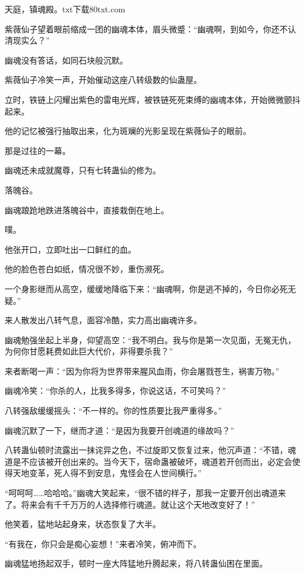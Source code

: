 
\begin{this_body}

天庭，镇魂殿。txt下载80txt.com

紫薇仙子望着眼前缩成一团的幽魂本体，眉头微蹙：“幽魂啊，到如今，你还不认清现实么？”

幽魂没有答话，如同石块般沉默。

紫薇仙子冷笑一声，开始催动这座八转级数的仙蛊屋。

立时，铁链上闪耀出紫色的雷电光辉，被铁链死死束缚的幽魂本体，开始微微颤抖起来。

他的记忆被强行抽取出来，化为斑斓的光影呈现在紫薇仙子的眼前。

那是过往的一幕。

幽魂还未成就魔尊，只有七转蛊仙的修为。

落魄谷。

幽魂踉跄地跌进落魄谷中，直接栽倒在地上。

噗。

他张开口，立即吐出一口鲜红的血。

他的脸色苍白如纸，情况很不妙，重伤濒死。

一个身影继而从高空，缓缓地降临下来：“幽魂啊，你是逃不掉的，今日你必死无疑。”

来人散发出八转气息，面容冷酷，实力高出幽魂许多。

幽魂勉强坐起上半身，仰望高空：“我不明白。我与你是第一次见面，无冤无仇，为何你甘愿耗费如此巨大代价，非得要杀我？”

来者断喝一声：“因为你将为世界带来腥风血雨，你会屠戮苍生，祸害万物。”

幽魂冷笑：“你杀的人，比我多得多，你说这话，不可笑吗？”

八转强敌缓缓摇头：“不一样的。你的性质要比我严重得多。”

幽魂沉默了一下，继而才道：“是因为我要开创魂道的缘故吗？”

八转蛊仙顿时流露出一抹诧异之色，不过旋即又恢复过来，他沉声道：“不错，魂道是不应该被开创出来的。当今天下，宿命蛊被破坏，魂道若开创而出，必定会使得天地变革，死人得不到安息，鬼怪会在人世间横行。”

“呵呵呵……哈哈哈。”幽魂大笑起来，“很不错的样子，那我一定要开创出魂道来了。将来会有千千万万的人选择修行魂道。就让这个天地改变好了！”

他笑着，猛地站起身来，状态恢复了大半。

“有我在，你只会是痴心妄想！”来者冷笑，俯冲而下。

幽魂猛地扬起双手，顿时一座大阵猛地升腾起来，将八转蛊仙困在里面。


\end{this_body}
